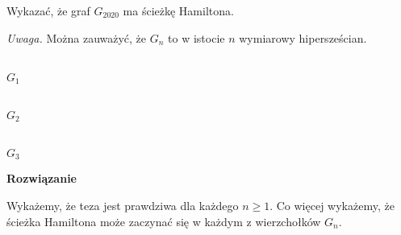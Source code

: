 	Wykazać, że graf $G_{2020}$ ma ścieżkę Hamiltona.

	\textit{Uwaga.} Można zauważyć, że $G_n$ to w istocie $n$ wymiarowy hipersześcian.

\vspace{20px}

\begin{minipage}{0.33\textwidth}
\begin{center}
	\\
	$G_1$
\end{center}
\end{minipage}
\begin{minipage}{0.33\textwidth}
\begin{center}
	\\
	$G_2$
\end{center}
\end{minipage}
\begin{minipage}{0.33\textwidth}
\begin{center}
	\\
	$G_3$
\end{center}
\end{minipage}

\noindent
\textbf{Rozwiązanie}

Wykażemy, że teza jest prawdziwa dla każdego $n \geqslant 1$. Co więcej wykażemy, że ścieżka Hamiltona może zaczynać się w każdym z wierzchołków $G_n$.

